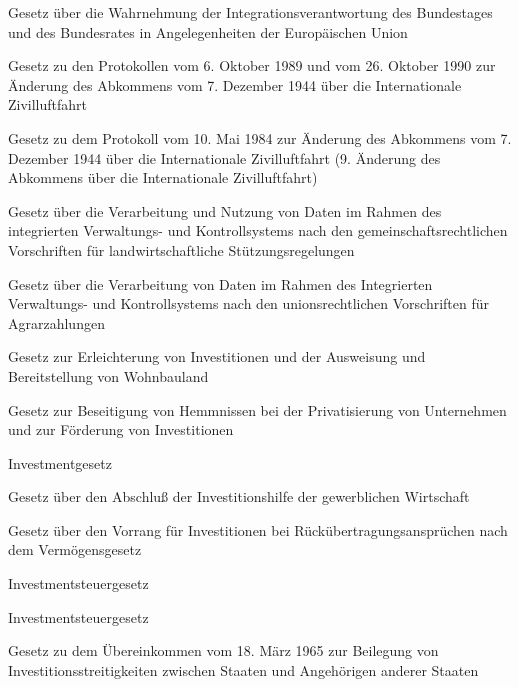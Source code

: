 \item[{IntVG}] Gesetz über die Wahrnehmung der Integrationsverantwortung des Bundestages und des Bundesrates in Angelegenheiten der Europäischen Union

\item[{IntZLuftAbkProt89-90G}] Gesetz zu den Protokollen vom 6. Oktober 1989 und vom 26. Oktober 1990 zur Änderung des Abkommens vom 7. Dezember 1944 über die Internationale Zivilluftfahrt

\item[{IntZLuftAbkProtG}] Gesetz zu dem Protokoll vom 10. Mai 1984 zur Änderung des Abkommens vom 7. Dezember 1944 über die Internationale Zivilluftfahrt (9. Änderung des Abkommens über die Internationale Zivilluftfahrt)

\item[{InVeKoSDG}] Gesetz über die Verarbeitung und Nutzung von Daten im Rahmen des integrierten Verwaltungs- und Kontrollsystems nach den gemeinschaftsrechtlichen Vorschriften für landwirtschaftliche Stützungsregelungen

\item[{InVeKoSDG-2015}] Gesetz über die Verarbeitung von Daten im Rahmen des Integrierten Verwaltungs- und Kontrollsystems nach den unionsrechtlichen Vorschriften für Agrarzahlungen

\item[{InvErlWoBauldG}] Gesetz zur Erleichterung von Investitionen und der Ausweisung und Bereitstellung von Wohnbauland

\item[{InvestHemBesG}] Gesetz zur Beseitigung von Hemmnissen bei der Privatisierung von Unternehmen und zur Förderung von Investitionen

\item[{InvG}] Investmentgesetz

\item[{InvHSG}] Gesetz über den Abschluß der Investitionshilfe der gewerblichen Wirtschaft

\item[{InVorG}] Gesetz über den Vorrang für Investitionen bei Rückübertragungsansprüchen nach dem Vermögensgesetz

\item[{InvStG}] Investmentsteuergesetz

\item[{InvStG-2018}] Investmentsteuergesetz

\item[{InvStreitÜbkG}] Gesetz zu dem Übereinkommen vom 18. März 1965 zur Beilegung von Investitionsstreitigkeiten zwischen Staaten und Angehörigen anderer Staaten

